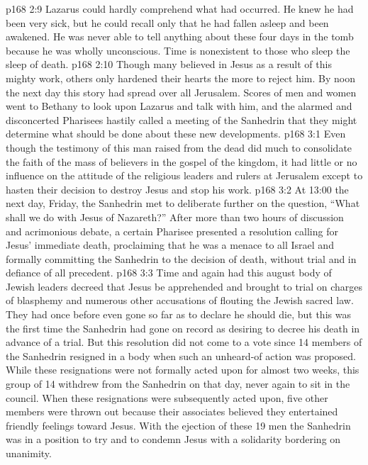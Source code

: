 \vs p168 2:9 \pc Lazarus could hardly comprehend what had occurred. He knew he had been very sick, but he could recall only that he had fallen asleep and been awakened. He was never able to tell anything about these four days in the tomb because he was wholly unconscious. Time is nonexistent to those who sleep the sleep of death.
\vs p168 2:10 Though many believed in Jesus as a result of this mighty work, others only hardened their hearts the more to reject him. By noon the next day this story had spread over all Jerusalem. Scores of men and women went to Bethany to look upon Lazarus and talk with him, and the alarmed and disconcerted Pharisees hastily called a meeting of the Sanhedrin that they might determine what should be done about these new developments.
\vs p168 3:1 Even though the testimony of this man raised from the dead did much to consolidate the faith of the mass of believers in the gospel of the kingdom, it had little or no influence on the attitude of the religious leaders and rulers at Jerusalem except to hasten their decision to destroy Jesus and stop his work.
\vs p168 3:2 \pc At 13:00 the next day, Friday, the Sanhedrin met to deliberate further on the question, “What shall we do with Jesus of Nazareth?” After more than two hours of discussion and acrimonious debate, a certain Pharisee presented a resolution calling for Jesus’ immediate death, proclaiming that he was a menace to all Israel and formally committing the Sanhedrin to the decision of death, without trial and in defiance of all precedent.
\vs p168 3:3 Time and again had this august body of Jewish leaders decreed that Jesus be apprehended and brought to trial on charges of blasphemy and numerous other accusations of flouting the Jewish sacred law. They had once before even gone so far as to declare he should die, but this was the first time the Sanhedrin had gone on record as desiring to decree his death in advance of a trial. But this resolution did not come to a vote since 14 members of the Sanhedrin resigned in a body when such an unheard\hyp{}of action was proposed. While these resignations were not formally acted upon for almost two weeks, this group of 14 withdrew from the Sanhedrin on that day, never again to sit in the council. When these resignations were subsequently acted upon, five other members were thrown out because their associates believed they entertained friendly feelings toward Jesus. With the ejection of these 19 men the Sanhedrin was in a position to try and to condemn Jesus with a solidarity bordering on unanimity.
